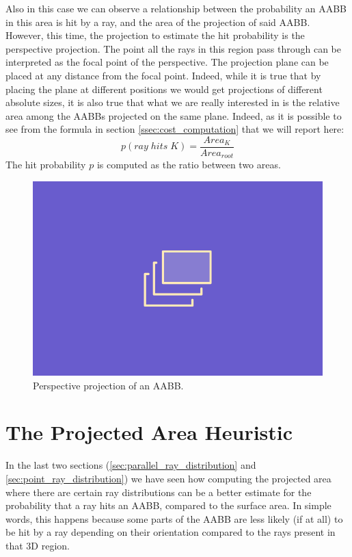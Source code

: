 \documentclass{PoliMi_MasterThesis}
\begin{document}
Also in this case we can observe a relationship between the probability an AABB in this area is hit by a ray, and the area of the projection of said AABB. However, this time, the projection to estimate the hit probability is the perspective projection. The point all the rays in this region pass through can be interpreted as the focal point of the perspective. The projection plane can be placed at any distance from the focal point. Indeed, while it is true that by placing the plane at different positions we would get projections of different absolute sizes, it is also true that what we are really interested in is the relative area among the AABBs projected on the same plane. Indeed, as it is possible to see from the formula in section \ref{ssec:cost_computation} that we will report here:
$$p(ray\; hits\; K) = \frac{Area_K}{Area_{root}}$$
The hit probability $p$ is computed as the ratio between two areas.

\begin{figure}[H]
    \centering
    \includegraphics[width=\textwidth*\real{0.5}]{Images/TODO.png}
    \caption{Perspective projection of an AABB.}
    \label{fig:aabb_perspective_projection}
\end{figure}

\section{The Projected Area Heuristic} \label{sec:projected_area_heuristic}
In the last two sections (\ref{sec:parallel_ray_distribution} and \ref{sec:point_ray_distribution}) we have seen how computing the projected area where there are certain ray distributions can be a better estimate for the probability that a ray hits an AABB, compared to the surface area. In simple words, this happens because some parts of the AABB are less likely (if at all) to be hit by a ray depending on their orientation compared to the rays present in that 3D region. 
\end{document}
